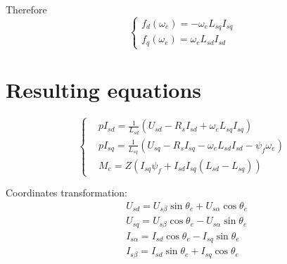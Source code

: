 \documentclass[11pt,a4paper,oneside]{report}
\begin{document}
Therefore
\begin{equation}
	\left\{
	\begin{split}
		f_d(\omega_e) = -\omega_eL_{sq}I_{sq}\\
		f_q(\omega_e) = \omega_eL_{sd}I_{sd}
	\end{split}
	\right.
\end{equation}

\section{Resulting equations}

\begin{equation}
	\left\{
	\begin{split}
		& pI_{sd}=\frac{1}{L_{sd}}(U_{sd}-R_sI_{sd}+\omega_eL_{sq}I_{sq})\\
		& pI_{sq} = \frac{1}{L_{sq}}(U_{sq}-R_sI_{sq}-\omega_eL_{sd}I_{sd}-\psi_f\omega_e)\\
		& M_e = Z(I_{sq}\psi_f+I_{sd}I_{sq}(L_{sd}-L_{sq}))
	\end{split}
	\right.
\end{equation}

Coordinates transformation:
\begin{equation}
	\begin{split}
		& U_{sd} = U_{s\beta}\sin\theta_e+U_{s\alpha}\cos\theta_e\\
		& U_{sq} = U_{s\beta}\cos\theta_e-U_{s\alpha}\sin\theta_e\\
		& I_{s\alpha} = I_{sd}\cos\theta_e-I_{sq}\sin\theta_e\\
		& I_{s\beta} = I_{sd}\sin\theta_e+I_{sq}\cos\theta_e
	\end{split}
\end{equation}

	
\end{document}
